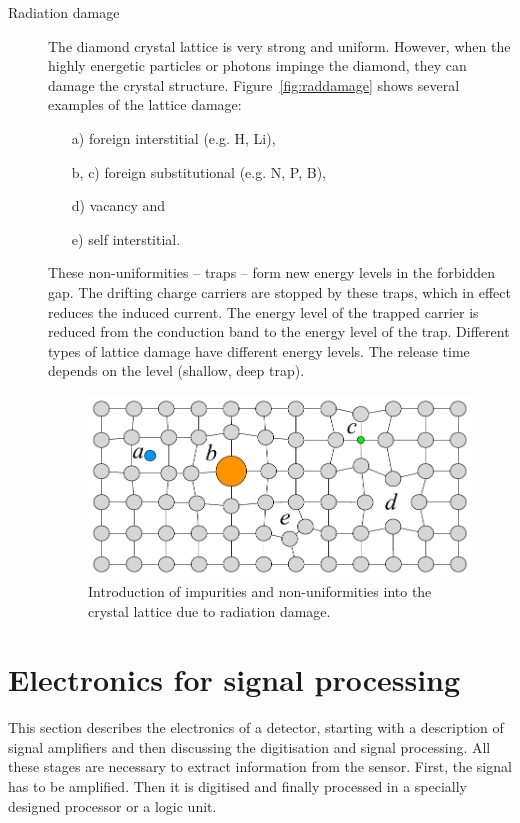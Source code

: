 \documentclass[twoside,12pt]{packages/mytustyle}  %
\begin{document}
\begin{description}
\item[Radiation damage]
The diamond crystal lattice is very strong and uniform. However, when the highly energetic particles or photons impinge the diamond, they can damage the crystal structure. Figure~\ref{fig:raddamage} shows several examples of the lattice damage:
\begin{enumerate}
\item[a)]foreign interstitial (e.g. H, Li),
\item[b, c)]foreign substitutional (e.g. N, P, B),
\item[d)]vacancy and
\item[e)]self interstitial.
\end{enumerate} 
These non-uniformities -- traps -- form new energy levels in the forbidden gap. The drifting charge carriers are stopped by these traps, which in effect reduces the induced current. The energy level of the trapped carrier is reduced from the conduction band to the energy level of the trap. Different types of lattice damage have different energy levels. The release time depends on the level (shallow, deep trap).

\begin{figure}[!t]
\begin{center}
\includegraphics[width=0.6\linewidth]{plots/raddamage}
\caption{Introduction of impurities and non-uniformities into the crystal lattice due to radiation damage.}
\label{fig:spcchg}
\end{center}
\end{figure}

\end{description}













\clearpage
\section{Electronics for signal processing} %
\label{sec:elecsigproc}
This section describes the electronics of a detector, starting with a description of signal amplifiers and then discussing the digitisation and signal processing. All these stages are necessary to extract information from the sensor. First, the signal has to be amplified. Then it is digitised and finally processed in a specially designed processor or a logic unit.
\end{document}

